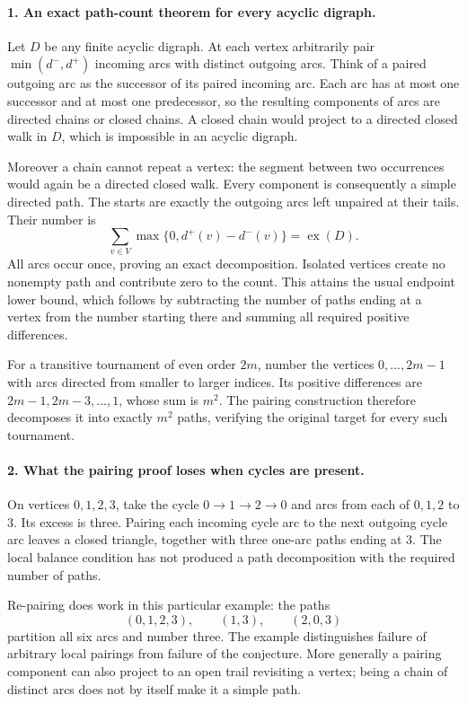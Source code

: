 \documentclass[11pt,a4paper]{article}
\begin{document}
\paragraph{1. An exact path-count theorem for every acyclic digraph.}
Let $D$ be any finite acyclic digraph. At each vertex arbitrarily
pair $\min(d^-,d^+)$ incoming arcs with distinct outgoing arcs.
Think of a paired outgoing arc as the successor of its paired
incoming arc. Each arc has at most one successor and at most one
predecessor, so the resulting components of arcs are directed chains
or closed chains. A closed chain would project to a directed closed
walk in $D$, which is impossible in an acyclic digraph.

Moreover a chain cannot repeat a vertex: the segment between two
occurrences would again be a directed closed walk. Every component
is consequently a simple directed path. The starts are exactly
the outgoing arcs left unpaired at their tails. Their number is
\[
           \sum_{v\in V}\max\{0,d^+(v)-d^-(v)\}
                         =\operatorname{ex}(D).
\]
All arcs occur once, proving an exact decomposition. Isolated vertices
create no nonempty path and contribute zero to the count.
This attains the usual endpoint lower bound, which follows by
subtracting the number of paths ending at a vertex from the number
starting there and summing all required positive differences.

For a transitive tournament of even order $2m$, number the vertices
$0,\ldots,2m-1$ with arcs directed from smaller to larger indices.
Its positive differences are $2m-1,2m-3,\ldots,1$, whose sum is $m^2$.
The pairing construction therefore decomposes it into exactly $m^2$
paths, verifying the original target for every such tournament.

\paragraph{2. What the pairing proof loses when cycles are present.}
On vertices $0,1,2,3$, take the cycle $0\to1\to2\to0$ and arcs
from each of $0,1,2$ to $3$. Its excess is three. Pairing each
incoming cycle arc to the next outgoing cycle arc leaves a closed
triangle, together with three one-arc paths ending at $3$. The local
balance condition has not produced a path decomposition with the
required number of paths.

Re-pairing does work in this particular example: the paths
\[
              (0,1,2,3),\qquad(1,3),\qquad(2,0,3)
\]
partition all six arcs and number three. The example distinguishes
failure of arbitrary local pairings from failure of the conjecture.
More generally a pairing component can also project to an open
trail revisiting a vertex; being a chain of distinct arcs does not
by itself make it a simple path.
\end{document}
